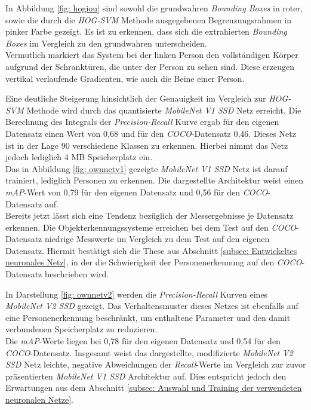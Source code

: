 In Abbildung \ref{fig: hogiou} sind sowohl die grundwahren \textit{Bounding Boxes} in roter, sowie die durch die \textit{HOG-SVM} Methode ausgegebenen Begrenzungsrahmen in pinker Farbe gezeigt. Es ist zu erkennen, dass sich die extrahierten \textit{Bounding Boxes} im Vergleich zu den grundwahren unterscheiden.\\

 Vermutlich markiert das System bei der linken Person den vollständigen Körper aufgrund der Schranktüren, die unter der Person zu sehen sind. Diese erzeugen vertikal verlaufende Gradienten, wie auch die Beine einer Person.


Eine deutliche Steigerung hinsichtlich der Genauigkeit im Vergleich zur \textit{HOG-SVM} Methode wird durch das quantisierte \textit{MobileNet V1 SSD} Netz erreicht. Die Berechnung des Integrals der \textit{Precision-Recall} Kurve ergab für den eigenen Datensatz einen Wert von 0,68 und für den \textit{COCO}-Datensatz 0,46. Dieses Netz ist in der Lage 90 verschiedene Klassen zu erkennen. Hierbei nimmt das Netz jedoch lediglich 4 MB Speicherplatz ein.\\



Das in Abbildung \ref{fig: ownnetv1} gezeigte \textit{MobileNet V1 SSD} Netz ist darauf trainiert, lediglich Personen zu erkennen. Die dargestellte Architektur weist einen \textit{mAP}-Wert von 0,79 für den eigenen Datensatz und 0,56 für den \textit{COCO}-Datensatz auf. \\

Bereits jetzt lässt sich eine Tendenz bezüglich der Messergebnisse je Datensatz erkennen. Die Objekterkennungssysteme erreichen bei dem Test auf den \textit{COCO}-Datensatz niedrige Messwerte im Vergleich zu dem Test auf den eigenen Datensatz. Hiermit bestätigt sich die These aus Abschnitt \ref{subsec: Entwickeltes neuronales Netz}, in der die Schwierigkeit der Personenerkennung auf den \textit{COCO}-Datensatz beschrieben wird.



In Darstellung \ref{fig: ownnetv2} werden die \textit{Precision-Recall} Kurven eines \textit{MobileNet V2 SSD} gezeigt. Das Verhaltensmuster dieses Netzes ist ebenfalls auf eine Personenerkennung beschränkt, um enthaltene Parameter und den damit verbundenen Speicherplatz zu reduzieren.\\

Die \textit{mAP}-Werte liegen bei 0,78 für den eigenen Datensatz und 0,54 für den \textit{COCO}-Datensatz. Insgesamt weist das dargestellte, modifizierte \textit{MobileNet V2 SSD} Netz leichte, negative Abweichungen der \textit{Recall}-Werte im Vergleich zur zuvor präsentierten \textit{MobileNet V1 SSD} Architektur auf. Dies entspricht jedoch den Erwartungen aus dem Abschnitt \ref{subsec: Auswahl und Training der verwendeten neuronalen Netze}.

